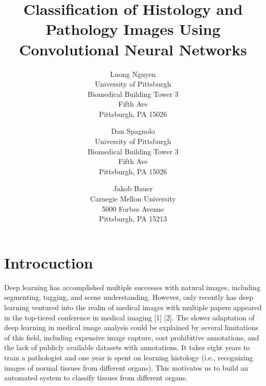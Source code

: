 \documentclass[10pt,twocolumn,letterpaper]{article}
\begin{document}
\title
{
    Classification of Histology and Pathology Images Using Convolutional Neural
    Networks%
}

\author{%
    Luong Nguyen\\
    University of Pittsburgh\\
    Biomedical Building Tower 3\\
    Fifth Ave\\
    Pittsburgh, PA 15026\\
    \and
    Dan Spagnolo\\
    University of Pittsburgh\\
    Biomedical Building Tower 3\\
    Fifth Ave\\
    Pittsburgh, PA 15026\\
    \and
    Jakob Bauer\\
    Carnegie Mellon University\\
    5000 Forbes Avenue\\
    Pittsburgh, PA 15213\\
}

\maketitle




\section{Introcuction}
\label{sec:Introcuction}

Deep learning has accomplished multiple successes with natural images, including segmenting, tagging, and scene understanding. However, only recently has deep learning ventured into the realm of medical images with multiple papers appeared in the top-tiered conference in medical imaging [1] [2]. The slower adaptation of deep learning in medical image analysis could be explained by several limitations of this field, including expensive image capture, cost prohibitive annotations, and the lack of publicly available datasets with annotations. It takes eight years to train a pathologist and one year is spent on learning histology (i.e., recognizing images of normal tissues from different organs). This motivates us to build an automated system to classify tissues from different organs.
\end{document}
